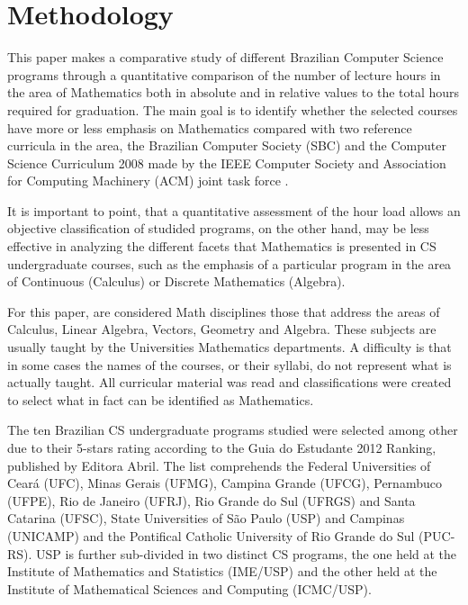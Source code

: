 \documentclass[conference]{IEEEtran}
\begin{document}
\section{Methodology}
	This paper makes a comparative study of different Brazilian Computer Science programs through a quantitative comparison of the number of lecture hours in the area of Mathematics both in absolute and in relative values to the total hours required for graduation. The main goal is to identify whether the selected courses have more or less emphasis on Mathematics compared with two reference curricula in the area, the Brazilian Computer Society (SBC) \cite{sbc} and the Computer Science Curriculum 2008 made by the IEEE Computer Society and Association for Computing Machinery (ACM) joint task force \cite{cs2008}.

	It is important to point, that a quantitative assessment of the hour load allows an objective classification of studided programs, on the other hand, may be less effective in analyzing the different facets that Mathematics is presented in CS undergraduate courses, such as the emphasis of a particular program in the area of Continuous (Calculus) or Discrete Mathematics (Algebra).



	For this paper, are considered Math disciplines those that address the areas of Calculus, Linear Algebra, Vectors, Geometry and Algebra. These subjects are usually taught by the Universities Mathematics departments. A difficulty is that in some cases the names of the courses, or their syllabi, do not represent what is actually taught. All curricular material was read and classifications were created to select what in fact can be identified as Mathematics.

	The ten Brazilian CS undergraduate programs studied were selected among other due to their 5-stars rating according to the Guia do Estudante 2012 Ranking, published by Editora Abril. \cite{guia_estudante} The list comprehends the Federal Universities of Ceará (UFC), Minas Gerais (UFMG), Campina Grande (UFCG), Pernambuco (UFPE), Rio de Janeiro (UFRJ), Rio Grande do Sul (UFRGS) and Santa Catarina (UFSC), State Universities of São Paulo (USP) and Campinas (UNICAMP) and the Pontifical Catholic University of Rio Grande do Sul (PUC-RS). USP is further sub-divided in two distinct CS programs, the one held at the Institute of Mathematics and Statistics (IME/USP) and the other held at the Institute of Mathematical Sciences and Computing (ICMC/USP).
	
\end{document}
